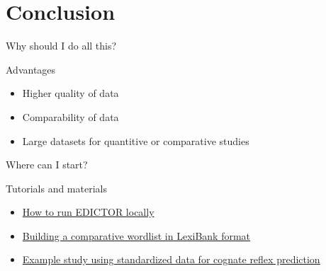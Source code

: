 \section{Conclusion}
\begin{frame}{Why should I do all this?}
    \begin{block}{Advantages}
        \begin{itemize}
            \item Higher quality of data
            \item Comparability of data
            \item Large datasets for quantitive or comparative studies
        \end{itemize}
    \end{block}
\end{frame}


\begin{frame}{Where can I start?}
    \begin{block}{Tutorials and materials}
        \begin{itemize}
            \item \href{https://doi.org/10.15475/calcip.2025.1.1}{How to run EDICTOR locally \cite{Blum2025}} \pause
            \item \href{https://doi.org/10.1038/s41597-024-02928-7}{Building a comparative wordlist in LexiBank format} \pause 
            \item \href{https://doi.org/10.1038/s41598-024-82515-3}{Example study using standardized data for cognate reflex prediction \cite{Blum2024d}}
        \end{itemize}
    \end{block}
\end{frame}
